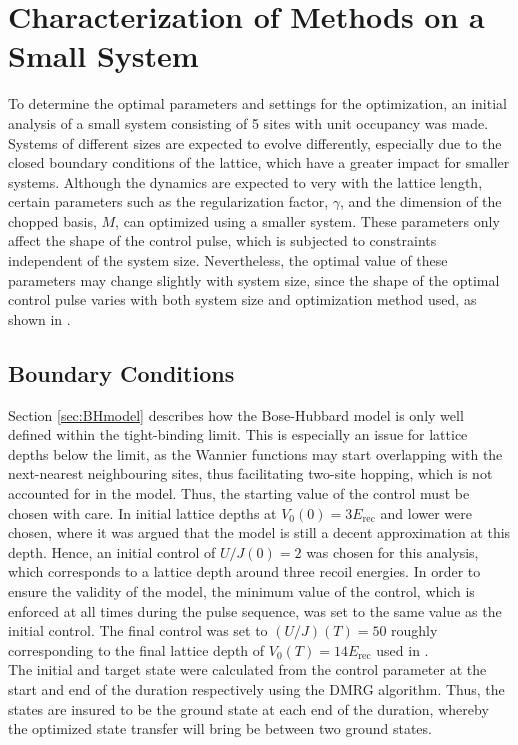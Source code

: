 \section{Characterization of Methods on a Small System} \label{sec:5partOptimization}
To determine the optimal parameters and settings for the optimization, an initial analysis of a small system consisting of 5 sites with unit occupancy was made. Systems of different sizes are expected to evolve differently, especially due to the closed boundary conditions of the lattice, which have a greater impact for smaller systems. Although the dynamics are expected to very with the lattice length, certain parameters such as the regularization factor, $\gamma$, and the dimension of the chopped basis, $M$, can optimized using a smaller system. These parameters only affect the shape of the control pulse, which is subjected to constraints independent of the system size. Nevertheless, the optimal value of these parameters may change slightly with system size, since the shape of the optimal control pulse varies with both system size and optimization method used, as shown in \cite{MajaJulie}. 


\subsection{Boundary Conditions}
Section \ref{sec:BHmodel} describes how the Bose-Hubbard model is only well defined within the tight-binding limit. This is especially an issue for lattice depths below the limit, as the Wannier functions may start overlapping with the next-nearest neighbouring sites, thus facilitating two-site hopping, which is not accounted for in the model. Thus, the starting value of the control must be chosen with care. In \cite{FrankBloch,Doria2011} initial lattice depths at $V_0 (0) = 3 E_{\mathrm{rec}}$ and lower were chosen, where it was argued that the model is still a decent approximation at this depth. Hence, an initial control of $U/J (0) = 2$ was chosen for this analysis, which corresponds to a lattice depth around three recoil energies. In order to ensure the validity of the model, the minimum value of the control, which is enforced at all times during the pulse sequence, was set to the same value as the initial control.  
The final control was set to $(U/J) (T) = 50$ roughly corresponding to the final lattice depth of $V_0 (T) = 14 E_{\mathrm{rec}}$ used in \cite{FrankBloch}.\\
The initial and target state were calculated from the control parameter at the start and end of the duration respectively using the DMRG algorithm. Thus, the states are insured to be the ground state at each end of the duration, whereby the optimized state transfer will bring be between two ground states.


